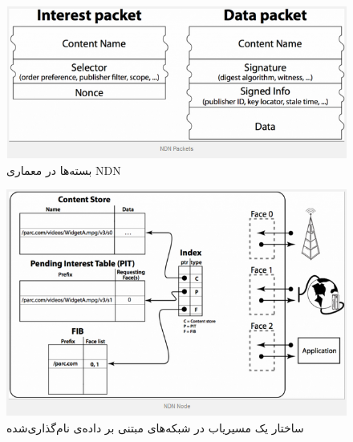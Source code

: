 \begin{figure}[H]
\centering
\includegraphics[scale=0.75]{./resources/figures/3_NDNpackets.png}
\caption{بسته‌ها در معماری NDN}
\label{fig:packets}
\end{figure}

\begin{figure}[H]
\centering
\includegraphics[scale=0.75]{./resources/figures/3_NDNnode.png}
\caption{ساختار یک مسیریاب در شبکه‌های مبتنی بر داده‌ی نام‌گذاری‌شده}
\label{fig:node}
\end{figure}



